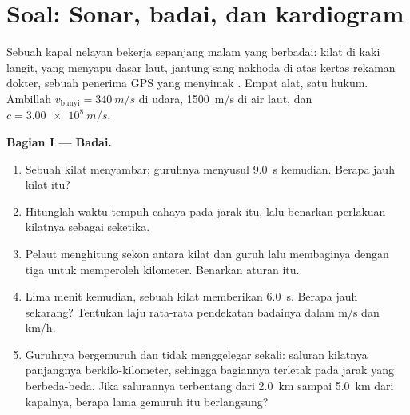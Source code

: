 \section{Soal: Sonar, badai, dan kardiogram}

\begin{problem}[{Soal akhir pekan --- membaca sinyal dunia: satu hukum,
$d = v\,t$, mengukur jarak badai, memetakan dasar laut, menghitung detak
jantung dan menyingkap cara kerja GPS}]
\label{pb:g10:signals-and-waves:1}
Sebuah kapal nelayan bekerja sepanjang malam yang berbadai: kilat di
kaki langit,  yang menyapu dasar laut, jantung sang nakhoda di atas
kertas rekaman dokter, sebuah penerima GPS yang menyimak . Empat
alat, satu hukum. Ambillah $v_{\text{bunyi}} = \qty{340}{m/s}$ di udara,
\qty{1500}{m/s} di air laut, dan $c = \qty{3.00e8}{m/s}$.

\medskip
\noindent\textbf{Bagian I --- Badai.}
\begin{enumerate}
  \item Sebuah kilat menyambar; guruhnya menyusul \qty{9.0}{s}
        kemudian. Berapa jauh kilat itu?
  \item Hitunglah waktu tempuh cahaya pada jarak itu, lalu benarkan
        perlakuan kilatnya sebagai seketika.
  \item Pelaut menghitung sekon antara kilat dan guruh lalu membaginya
        dengan tiga untuk memperoleh kilometer. Benarkan aturan itu.
  \item Lima menit kemudian, sebuah kilat memberikan \qty{6.0}{s}.
        Berapa jauh sekarang? Tentukan laju rata-rata pendekatan
        badainya dalam \unit{m/s} dan \unit{km/h}.
  \item Guruhnya bergemuruh dan tidak menggelegar sekali: saluran
        kilatnya panjangnya berkilo-kilometer, sehingga bagiannya
        terletak pada jarak yang berbeda-beda. Jika salurannya
        terbentang dari \qty{2.0}{km} sampai \qty{5.0}{km} dari
        kapalnya, berapa lama gemuruh itu berlangsung?
\end{enumerate}


\end{problem}
